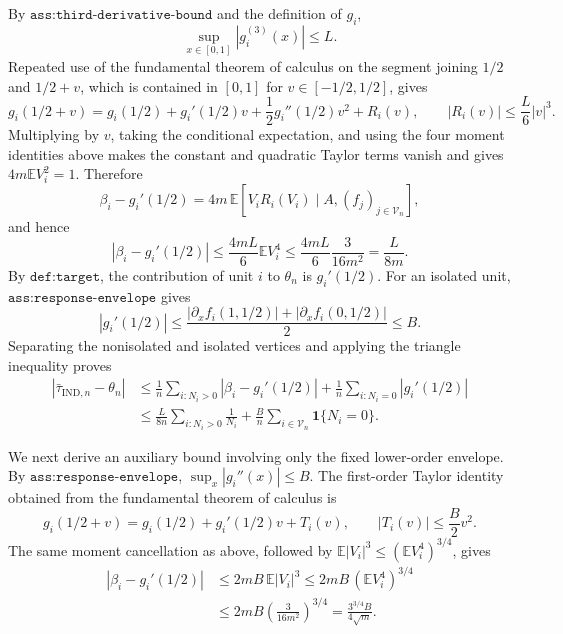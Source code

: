 By \(\texttt{ass:third-derivative-bound}\) and the definition of \(g_i\),
\[
 \sup_{x\in[0,1]}\left|g_i^{(3)}(x)\right|\le L.
\]
Repeated use of the fundamental theorem of calculus on the segment joining \(1/2\) and \(1/2+v\), which is contained in \([0,1]\) for \(v\in[-1/2,1/2]\), gives
\[
 g_i(1/2+v)
 =g_i(1/2)+g_i'(1/2)v+\frac12g_i''(1/2)v^2+R_i(v),
 \qquad
 |R_i(v)|\le\frac L6|v|^3.
\]
Multiplying by \(v\), taking the conditional expectation, and using the four moment identities above makes the constant and quadratic Taylor terms vanish and gives \(4m\mathbb E V_i^2=1\). Therefore
\[
 \beta_i-g_i'(1/2)
 =4m\,\mathbb E\!\left[V_iR_i(V_i)\mid A,(f_j)_{j\in\mathcal V_n}\right],
\]
and hence
\[
 \left|\beta_i-g_i'(1/2)\right|
 \le \frac{4mL}{6}\mathbb E V_i^4
 \le \frac{4mL}{6}\frac3{16m^2}
 =\frac{L}{8m}.
\]
By \(\texttt{def:target}\), the contribution of unit \(i\) to \(\theta_n\) is \(g_i'(1/2)\). For an isolated unit, \(\texttt{ass:response-envelope}\) gives
\[
 |g_i'(1/2)|
 \le\frac{|\partial_xf_i(1,1/2)|+|\partial_xf_i(0,1/2)|}{2}
 \le B.
\]
Separating the nonisolated and isolated vertices and applying the triangle inequality proves
\[
\begin{aligned}
 \left|\bar\tau_{\mathrm{IND},n}-\theta_n\right|
 &\le \frac1n\sum_{i:N_i>0}\left|\beta_i-g_i'(1/2)\right|
 +\frac1n\sum_{i:N_i=0}|g_i'(1/2)|\\
 &\le \frac{L}{8n}\sum_{i:N_i>0}\frac1{N_i}
 +\frac Bn\sum_{i\in\mathcal V_n}\mathbf1\{N_i=0\}.
\end{aligned}
\]

We next derive an auxiliary bound involving only the fixed lower-order envelope. By \(\texttt{ass:response-envelope}\), \(\sup_x|g_i''(x)|\le B\). The first-order Taylor identity obtained from the fundamental theorem of calculus is
\[
 g_i(1/2+v)=g_i(1/2)+g_i'(1/2)v+T_i(v),
 \qquad
 |T_i(v)|\le\frac B2v^2.
\]
The same moment cancellation as above, followed by \(\mathbb E|V_i|^3\le(\mathbb EV_i^4)^{3/4}\), gives
\[
\begin{aligned}
 |\beta_i-g_i'(1/2)|
 &\le 2mB\,\mathbb E|V_i|^3
 \le 2mB\,(\mathbb E V_i^4)^{3/4}\\
 &\le 2mB\left(\frac3{16m^2}\right)^{3/4}
 =\frac{3^{3/4}B}{4\sqrt m}.
\end{aligned}
\]

